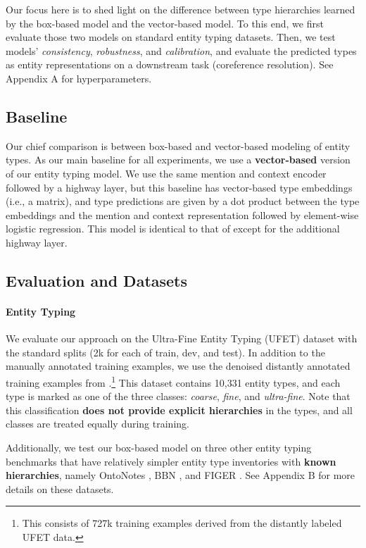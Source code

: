 \documentclass[11pt,a4paper]{article}
\begin{document}
Our focus here is to shed light on the difference between type hierarchies learned by the box-based model and the vector-based model. To this end, we first evaluate those two models on standard entity typing datasets. Then, we test models' \emph{consistency}, \emph{robustness}, and \emph{calibration}, and evaluate the predicted types as entity representations on a downstream task (coreference resolution). See Appendix A for hyperparameters.

\subsection{Baseline}

Our chief comparison is between box-based and vector-based modeling of entity types. As our main baseline for all experiments, we use a \textbf{vector-based} version of our entity typing model. We use the same mention and context encoder followed by a highway layer, but this baseline has vector-based type embeddings (i.e., a  matrix), and type predictions are given by a dot product between the type embeddings and the mention and context representation followed by element-wise logistic regression. This model is identical to that of \citet{Yasumasa_Onoe_20_Findings} except for the additional highway layer.

\subsection{Evaluation and Datasets}

\paragraph{Entity Typing} We evaluate our approach on the Ultra-Fine Entity Typing (UFET) dataset \citep{Eunsol_Choi_18} with the standard splits (2k for each of train, dev, and test). In addition to the manually annotated training examples, we use the denoised distantly annotated training examples from \citet{Yasumasa_Onoe_19}.\footnote{This consists of 727k training examples derived from the distantly labeled UFET data.} This dataset contains 10,331 entity types, and each type is marked as one of the three classes: \emph{coarse}, \emph{fine}, and \emph{ultra-fine}. Note that this classification \textbf{does not provide explicit hierarchies} in the types, and all classes are treated equally during training.

Additionally, we test our box-based model on three other entity typing benchmarks that have relatively simpler entity type inventories with \textbf{known hierarchies}, namely OntoNotes \citep{Dan_Gillick_14}, BBN \citep{bbn} , and FIGER \citep{Xiao_Ling_12}. See Appendix B for more details on these datasets.
\end{document}
